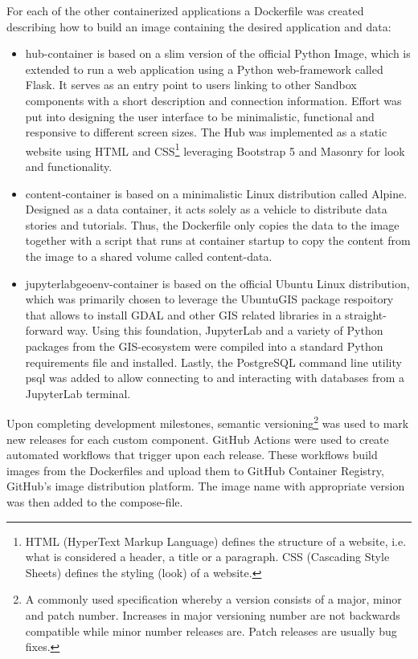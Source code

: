 \documentclass[11pt, a4paper, oneside, parskip=full-]{scrartcl}
\begin{document}
For each of the other containerized applications a Dockerfile was created
describing how to build an image containing the desired application and data:

\begin{itemize}
  \item hub-container is based on a slim version of the official Python
  Image\cite{pythonimage}, which is extended to run a web application using a
  Python web-framework called Flask\cite{flask}. It serves as an entry point to
  users linking to other Sandbox components with a short description and
  connection information. Effort was put into designing the user interface to be
  minimalistic, functional and responsive to different screen sizes. The Hub was
  implemented as a static website using HTML and CSS\footnote{HTML (HyperText
  Markup Language) defines the structure of a website, i.e. what is considered a
  header, a title or a paragraph. CSS (Cascading Style Sheets) defines the
  styling (look) of a website.} leveraging Bootstrap 5\cite{bootstrap5} and
  Masonry\cite{masonry} for look and functionality.
  \item content-container is based on a minimalistic Linux distribution called
  Alpine\cite{alpinelinux}. Designed as a data container, it acts solely as a
  vehicle to distribute data stories and tutorials. Thus, the Dockerfile only
  copies the data to the image together with a script that runs at container
  startup to copy the content from the image to a shared volume called
  content-data.
  \item jupyterlabgeoenv-container is based on the official Ubuntu Linux
  distribution\cite{ubuntulinux}, which was primarily chosen to leverage the
  UbuntuGIS package respoitory\cite{ubuntugisppa} that allows to install GDAL
  and other GIS related libraries in a straight-forward way. Using this
  foundation, JupyterLab and a variety of Python packages from the GIS-ecosystem
  were compiled into a standard Python requirements
  file\cite{piprequirementsfile} and installed. Lastly, the PostgreSQL command
  line utility psql was added to allow connecting to and interacting with
  databases from a JupyterLab terminal.
\end{itemize}

Upon completing development milestones, semantic versioning\footnote{A commonly
used specification whereby a version consists of a major, minor and patch
number. Increases in major versioning number are not backwards compatible while
minor number releases are. Patch releases are usually bug fixes.} was used to
mark new releases for each custom component. GitHub Actions\cite{githubactions}
were used to create automated workflows that trigger upon each release. These
workflows build images from the Dockerfiles and upload them to GitHub Container
Registry\cite{gcr}, GitHub's image distribution platform. The image name with
appropriate version was then added to the compose-file.
\end{document}
